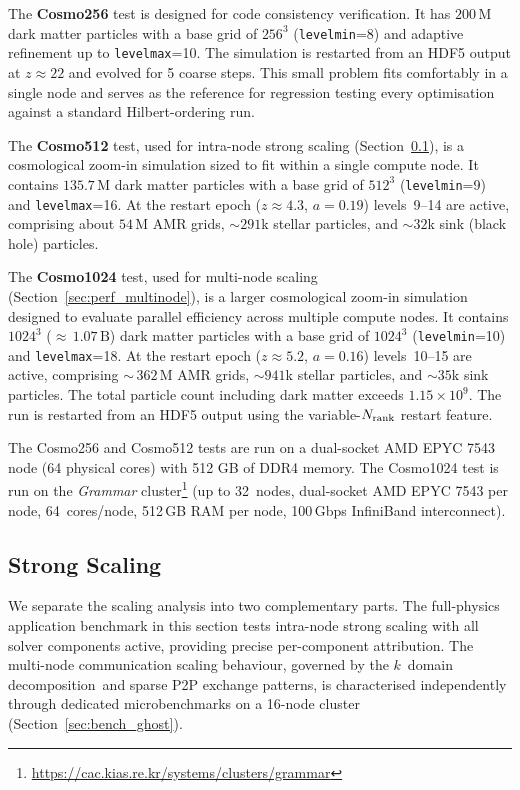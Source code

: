 \documentclass[fleqn,usenatbib]{mnras}
\newcommand{\nrank}{N_{\rm rank}}
\newcommand{\ksec}{\ensuremath{k}\text{-section}}
\newcommand{\code}[1]{\texttt{#1}}
\newcommand{\dd}[0]{{domain decomposition}}
\begin{document}
The \textbf{Cosmo256} test is designed for code consistency
verification.  It has $200\,\mathrm{M}$ dark matter particles with a
base grid of $256^3$ (\code{levelmin}=8) and adaptive refinement up
to \code{levelmax}=10.  The simulation is restarted from an HDF5
output at $z \approx 22$ and evolved for 5 coarse steps.
This small problem fits comfortably in a single node and serves as
the reference for regression testing every optimisation against a
standard Hilbert-ordering run.

The \textbf{Cosmo512} test, used for intra-node strong scaling
(Section~\ref{sec:perf_timing}), is a cosmological zoom-in
simulation sized to fit within a single compute node.  It contains
$135.7\,\mathrm{M}$ dark matter particles with a base grid of
$512^3$ (\code{levelmin}=9) and \code{levelmax}=16.  At the
restart epoch ($z \approx 4.3$, $a = 0.19$) levels~9--14 are active,
comprising about $54\,\mathrm{M}$ AMR grids, ${\sim}291$k stellar
particles, and ${\sim}32$k sink (black hole) particles.

The \textbf{Cosmo1024} test, used for multi-node scaling
(Section~\ref{sec:perf_multinode}), is a larger cosmological
zoom-in simulation designed to evaluate parallel efficiency across
multiple compute nodes.
It contains $1024^3$ (${\approx}\,1.07\,\mathrm{B}$) dark matter
particles with a base grid of $1024^3$ (\code{levelmin}=10) and
\code{levelmax}=18.  At the restart epoch ($z \approx 5.2$,
$a = 0.16$) levels~10--15 are active, comprising
${\sim}\,362\,\mathrm{M}$ AMR grids, ${\sim}941$k stellar
particles, and ${\sim}35$k sink particles.  The total particle
count including dark matter exceeds $1.15 \times 10^9$.
The run is restarted from an HDF5 output using the
variable-$\nrank$ restart feature.

The Cosmo256 and Cosmo512 tests are run on a dual-socket AMD EPYC
7543 node (64 physical cores) with 512 GB of DDR4
memory.  The Cosmo1024 test is run on the \textit{Grammar}
cluster\footnote{\url{https://cac.kias.re.kr/systems/clusters/grammar}}
(up to 32~nodes, dual-socket AMD EPYC 7543 per node, 64~cores/node,
512\,GB RAM per node, 100\,Gbps InfiniBand interconnect).


\subsection{Strong Scaling}
\label{sec:perf_timing}

We separate the scaling analysis into two complementary parts.  The
full-physics application benchmark in this section tests intra-node
strong scaling with all solver components active, providing precise
per-component attribution.  The multi-node communication scaling
behaviour, governed by the \ksec\ \dd\ and sparse P2P exchange
patterns, is characterised independently through dedicated
microbenchmarks on a 16-node cluster
(Section~\ref{sec:bench_ghost}).
\end{document}
